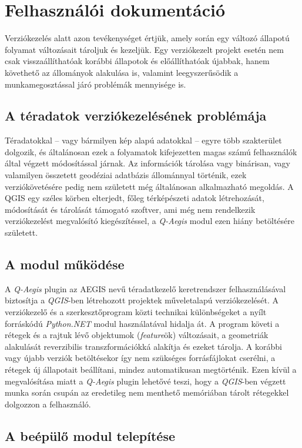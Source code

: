 \chapter{Felhasználói dokumentáció}
\label{ch:user}

Verziókezelés alatt azon tevékenységet értjük, amely során egy változó állapotú folyamat változásait tároljuk és kezeljük. Egy verziókezelt projekt esetén nem csak visszaállíthatóak korábbi állapotok és előállíthatóak újabbak, hanem követhető az állományok alakulása is, valamint leegyszerűsödik a munkamegosztással járó problémák mennyisége is.

\section{A téradatok verziókezelésének problémája}
Téradatokkal -- vagy bármilyen kép alapú adatokkal -- egyre több szakterület dolgozik, és általánosan ezek a folyamatok kifejezetten magas számú felhasználók által végzett módosítással járnak. Az információk tárolása vagy binárisan, vagy valamilyen összetett geodéziai adatbázis állománnyal történik, ezek verziókövetésére pedig nem született még általánosan alkalmazható megoldás. A QGIS egy széles körben elterjedt, főleg térképészeti adatok létrehozását, módosítását és tárolását támogató szoftver, ami még nem rendelkezik verziókezelést megvalósító kiegészítéssel, a \emph{Q-Aegis} modul ezen hiány betöltésére született.
\section{A modul működése}
A \emph{Q-Aegis} plugin az AEGIS nevű téradatkezelő keretrendszer felhasználásával biztosítja a \emph{QGIS}-ben létrehozott projektek műveletalapú verziókezelését. A verziókezelő és a szerkesztőprogram közti technikai különbségeket a nyílt forráskódú \emph{Python.NET} \cite{pythonnet} modul használatával hidalja át. A program követi a rétegek és a rajtuk lévő objektumok (\emph{feature}ök) változásait, a geometriák alakulását reverzibilis transzformációkká alakítja és ezeket tárolja. A korábbi vagy újabb verziók betöltésekor így nem szükséges forrásfájlokat cserélni, a rétegek új állapotait beállítani, mindez automatikusan megtörténik. Ezen kívül a megvalósítása miatt a \emph{Q-Aegis} plugin lehetővé teszi, hogy a \emph{QGIS}-ben végzett munka során csupán az eredetileg nem menthető memóriában tárolt rétegekkel dolgozzon a felhasználó.

\section{A beépülő modul telepítése}

